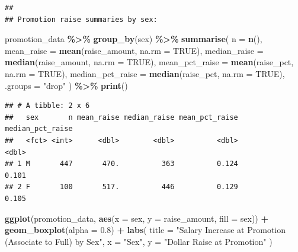 \documentclass[
]{article}
\newenvironment{Shaded}{\begin{snugshade}}{\end{snugshade}}
\newcommand{\AttributeTok}[1]{\textcolor[rgb]{0.13,0.29,0.53}{#1}}
\newcommand{\ConstantTok}[1]{\textcolor[rgb]{0.56,0.35,0.01}{#1}}
\newcommand{\FloatTok}[1]{\textcolor[rgb]{0.00,0.00,0.81}{#1}}
\newcommand{\FunctionTok}[1]{\textcolor[rgb]{0.13,0.29,0.53}{\textbf{#1}}}
\newcommand{\NormalTok}[1]{#1}
\newcommand{\SpecialCharTok}[1]{\textcolor[rgb]{0.81,0.36,0.00}{\textbf{#1}}}
\newcommand{\StringTok}[1]{\textcolor[rgb]{0.31,0.60,0.02}{#1}}
\begin{document}
\begin{verbatim}
## 
## Promotion raise summaries by sex:
\end{verbatim}

\begin{Shaded}
\begin{Highlighting}[]
\NormalTok{promotion\_data }\SpecialCharTok{\%\textgreater{}\%}
  \FunctionTok{group\_by}\NormalTok{(sex) }\SpecialCharTok{\%\textgreater{}\%}
  \FunctionTok{summarise}\NormalTok{(}
    \AttributeTok{n =} \FunctionTok{n}\NormalTok{(),}
    \AttributeTok{mean\_raise =} \FunctionTok{mean}\NormalTok{(raise\_amount, }\AttributeTok{na.rm =} \ConstantTok{TRUE}\NormalTok{),}
    \AttributeTok{median\_raise =} \FunctionTok{median}\NormalTok{(raise\_amount, }\AttributeTok{na.rm =} \ConstantTok{TRUE}\NormalTok{),}
    \AttributeTok{mean\_pct\_raise =} \FunctionTok{mean}\NormalTok{(raise\_pct, }\AttributeTok{na.rm =} \ConstantTok{TRUE}\NormalTok{),}
    \AttributeTok{median\_pct\_raise =} \FunctionTok{median}\NormalTok{(raise\_pct, }\AttributeTok{na.rm =} \ConstantTok{TRUE}\NormalTok{),}
    \AttributeTok{.groups =} \StringTok{"drop"}
\NormalTok{  ) }\SpecialCharTok{\%\textgreater{}\%}
  \FunctionTok{print}\NormalTok{()}
\end{Highlighting}
\end{Shaded}

\begin{verbatim}
## # A tibble: 2 x 6
##   sex       n mean_raise median_raise mean_pct_raise median_pct_raise
##   <fct> <int>      <dbl>        <dbl>          <dbl>            <dbl>
## 1 M       447       470.          363          0.124            0.101
## 2 F       100       517.          446          0.129            0.105
\end{verbatim}

\begin{Shaded}
\begin{Highlighting}[]
\FunctionTok{ggplot}\NormalTok{(promotion\_data, }\FunctionTok{aes}\NormalTok{(}\AttributeTok{x =}\NormalTok{ sex, }\AttributeTok{y =}\NormalTok{ raise\_amount, }\AttributeTok{fill =}\NormalTok{ sex)) }\SpecialCharTok{+}
  \FunctionTok{geom\_boxplot}\NormalTok{(}\AttributeTok{alpha =} \FloatTok{0.8}\NormalTok{) }\SpecialCharTok{+}
  \FunctionTok{labs}\NormalTok{(}
    \AttributeTok{title =} \StringTok{"Salary Increase at Promotion (Associate to Full) by Sex"}\NormalTok{,}
    \AttributeTok{x =} \StringTok{"Sex"}\NormalTok{,}
    \AttributeTok{y =} \StringTok{"Dollar Raise at Promotion"}
\NormalTok{  )}
\end{Highlighting}
\end{Shaded}
\end{document}
